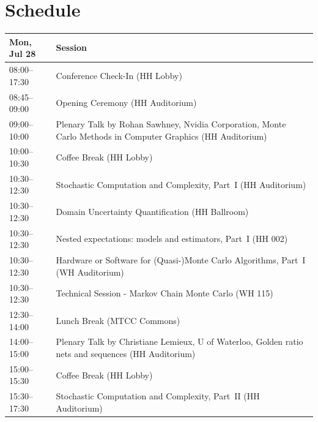 \documentclass[12pt,lettersize,oneside]{book} %
\begin{document}
\chapter{Schedule}
\begin{table}
{\footnotesize
\begin{tabularx}{\textwidth}{>{\hsize=0.32\hsize}X|>{\hsize=1.7\hsize}X}
\hline
\textbf{Mon, Jul 28} & \textbf{Session} \\
\hline
\cellcolor{\SessionTitleColor}08:00--17:30 & \cellcolor{\SessionTitleColor}Conference Check-In (HH Lobby) \\
\cellcolor{\OpeningClosingColor}08:45--09:00 & \cellcolor{\OpeningClosingColor}Opening Ceremony (HH Auditorium) \\
\cellcolor{\PlenaryColor}09:00--10:00 & \cellcolor{\PlenaryColor}Plenary Talk by Rohan Sawhney, Nvidia Corporation, Monte Carlo Methods in Computer Graphics (HH Auditorium) \\
\cellcolor{\EmptyColor}10:00--10:30 & \cellcolor{\EmptyColor}Coffee Break (HH Lobby) \\
\cellcolor{\SessionTitleColor}10:30--12:30 & \cellcolor{\SessionTitleColor}Stochastic Computation and Complexity, Part~I (HH Auditorium) \\
\cellcolor{\SessionTitleColor}10:30--12:30 & \cellcolor{\SessionTitleColor}Domain Uncertainty Quantification (HH Ballroom) \\
\cellcolor{\SessionTitleColor}10:30--12:30 & \cellcolor{\SessionTitleColor}Nested expectations: models and estimators, Part~I (HH 002) \\
\cellcolor{\SessionTitleColor}10:30--12:30 & \cellcolor{\SessionTitleColor}Hardware or Software for (Quasi-)Monte Carlo Algorithms, Part~I (WH Auditorium) \\
\cellcolor{\SessionLightColor}10:30--12:30 & \cellcolor{\SessionLightColor}Technical Session - Markov Chain Monte Carlo (WH 115) \\
\cellcolor{\EmptyColor}12:30--14:00 & \cellcolor{\EmptyColor}Lunch Break (MTCC Commons) \\
\cellcolor{\PlenaryColor}14:00--15:00 & \cellcolor{\PlenaryColor}Plenary Talk by Christiane Lemieux, U of Waterloo, Golden ratio nets and sequences (HH Auditorium) \\
\cellcolor{\EmptyColor}15:00--15:30 & \cellcolor{\EmptyColor}Coffee Break (HH Lobby) \\
\cellcolor{\SessionTitleColor}15:30--17:30 & \cellcolor{\SessionTitleColor}Stochastic Computation and Complexity, Part~II (HH Auditorium) \\

\end{tabularx}}
\end{table}
\end{document}
